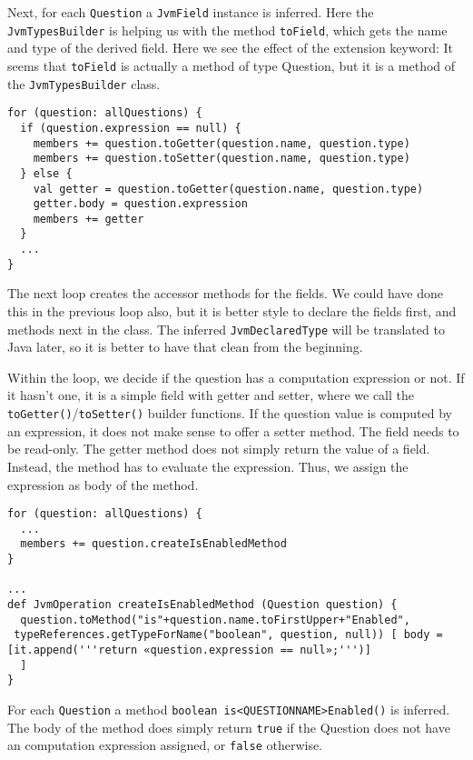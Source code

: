 Next, for each \texttt{Question} a \texttt{JvmField} instance is inferred. Here the
\texttt{JvmTypesBuilder} is helping us with the method \texttt{toField}, which gets the name and
type of the derived field. Here we see the effect of the extension keyword: It
seems that \texttt{toField} is actually a method of type Question, but it is a method of
the \texttt{JvmTypesBuilder} class.

\begin{lstlisting}[language=Xtend]
for (question: allQuestions) {
  if (question.expression == null) {
    members += question.toGetter(question.name, question.type)
    members += question.toSetter(question.name, question.type)
  } else {
    val getter = question.toGetter(question.name, question.type)
    getter.body = question.expression
    members += getter
  }
  ...
}
\end{lstlisting}

The next loop creates the accessor methods for the fields. We could have done
this in the previous loop also, but it is better style to declare the fields
first, and methods next in the class. The inferred \texttt{JvmDeclaredType} will be
translated to Java later, so it is better to have that clean from the beginning.

Within the loop, we decide if the question has a computation expression or not.
If it hasn't one, it is a simple field with getter and setter, where we call the
\texttt{toGetter()}/\texttt{toSetter()} builder functions. If the question value is computed by an
expression, it does not make sense to offer a setter method. The field needs to
be read-only. The getter method does not simply return the value of a field.
Instead, the method has to evaluate the expression. Thus, we assign the
expression as body of the method.

\begin{lstlisting}[language=Xtend]
for (question: allQuestions) {
  ...
  members += question.createIsEnabledMethod
}

...
def JvmOperation createIsEnabledMethod (Question question) {
  question.toMethod("is"+question.name.toFirstUpper+"Enabled",
 typeReferences.getTypeForName("boolean", question, null)) [ body = [it.append('''return «question.expression == null»;''')]
  ]
}
\end{lstlisting}

For each \texttt{Question} a method \texttt{boolean is<QUESTIONNAME>Enabled()}
is inferred. The body of the method does simply return \texttt{true} if the Question does
not have an computation expression assigned, or \texttt{false} otherwise.

